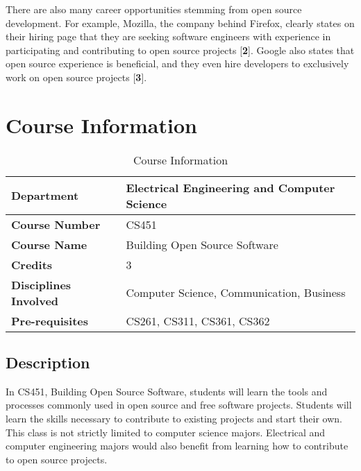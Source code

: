 \documentclass[12pt,letterpaper]{article}
\newcommand{\mkref}[1]{[\textbf{#1}]}
\begin{document}
There are also many career opportunities stemming from open source development.
For example, Mozilla, the company behind Firefox, clearly states on their hiring
page that they are seeking software engineers with experience in participating
and contributing to open source projects \mkref{2}.  Google also states that
open source experience is beneficial, and they even hire developers to
exclusively work on open source projects \mkref{3}.

\section{Course Information}

\begin{table}[H]
  \begin{center}
    \renewcommand{\arraystretch}{1.5}
    \begin{tabular}{ | l | l | }
      \hline
      \textbf{Department}
        & Electrical Engineering and Computer Science \\ \hline
      \textbf{Course Number}
        & CS451 \\ \hline
      \textbf{Course Name}
        & Building Open Source Software\\ \hline
      \textbf{Credits}
        & 3 \\ \hline
      \textbf{Disciplines Involved}
        & Computer Science, Communication, Business \\ \hline
      \textbf{Pre-requisites}
        & CS261, CS311, CS361, CS362 \\ \hline
    \end{tabular}
    \caption{Course Information}
  \end{center}
\end{table}

\subsection{Description}
In CS451, Building Open Source Software, students will learn the tools and
processes commonly used in open source and free software projects.  Students
will learn the skills necessary to contribute to existing projects and start
their own.  This class is not strictly limited to computer science majors.
Electrical and computer engineering majors would also benefit from learning how
to contribute to open source projects.
\end{document}
